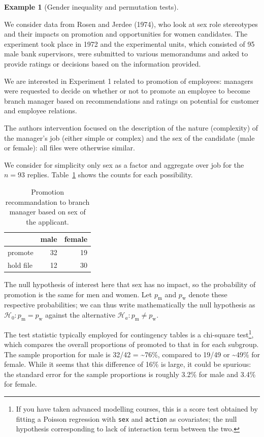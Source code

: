 \documentclass[
  11pt,
  letterpaper,
]{scrbook}
\theoremstyle{definition}
\newtheorem{example}{Example}[chapter]
\theoremstyle{remark}
\begin{document}
\begin{example}[Gender inequality and permutation
tests]\protect\hypertarget{exm-rosenjerdee74}{}\label{exm-rosenjerdee74}

We consider data from Rosen and Jerdee (1974), who look at sex role
stereotypes and their impacts on promotion and opportunities for women
candidates. The experiment took place in 1972 and the experimental
units, which consisted of 95 male bank supervisors, were submitted to
various memorandums and asked to provide ratings or decisions based on
the information provided.

We are interested in Experiment 1 related to promotion of employees:
managers were requested to decide on whether or not to promote an
employee to become branch manager based on recommendations and ratings
on potential for customer and employee relations.

The authors intervention focused on the description of the nature
(complexity) of the manager's job (either simple or complex) and the sex
of the candidate (male or female): all files were otherwise similar.

We consider for simplicity only sex as a factor and aggregate over job
for the \(n=93\) replies. Table~\ref{tbl-rosen-table1} shows the counts
for each possibility.

\hypertarget{tbl-rosen-table1}{}
\begin{table}
\caption{\label{tbl-rosen-table1}Promotion recommandation to branch manager based on sex of the
applicant. }\tabularnewline

\centering
\begin{tabular}{lrr}
\toprule
  & male & female\\
\midrule
promote & 32 & 19\\
hold file & 12 & 30\\
\bottomrule
\end{tabular}
\end{table}

The null hypothesis of interest here that sex has no impact, so the
probability of promotion is the same for men and women. Let
\(p_{\text{m}}\) and \(p_{\text{w}}\) denote these respective
probabilities; we can thus write mathematically the null hypothesis as
\(\mathscr{H}_0: p_{\text{m}} = p_{\text{w}}\) against the alternative
\(\mathscr{H}_a: p_{\text{m}} \neq p_{\text{w}}\).

The test statistic typically employed for contingency tables is a
chi-square test\footnote{If you have taken advanced modelling courses,
  this is a score test obtained by fitting a Poisson regression with
  \texttt{sex} and \texttt{action} as covariates; the null hypothesis
  corresponding to lack of interaction term between the two.}, which
compares the overall proportions of promoted to that in for each
subgroup. The sample proportion for male is 32/42 = \textasciitilde76\%,
compared to 19/49 or \textasciitilde49\% for female. While it seems that
this difference of 16\% is large, it could be spurious: the standard
error for the sample proportions is roughly 3.2\% for male and 3.4\% for
female.


\end{example}
\end{document}
